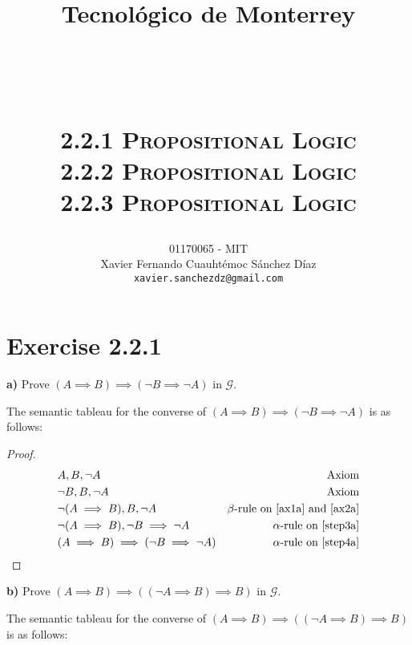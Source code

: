\documentclass[titlepage, letterpaper, fleqn]{article}
\title{
\vspace{1in}
\textbf{Tecnológico de Monterrey} \\
\vspace{0.5in}
\textmd{\mahclass} \\
\large{\textit{\mahteacher}} \\
\vspace{0.5in}
\textsc{\mahtitle}\\
\textsc{2.2.1 Propositional Logic}\\
\textsc{2.2.2 Propositional Logic}\\
\textsc{2.2.3 Propositional Logic}\\
\author{01170065  - MIT \\
Xavier Fernando Cuauhtémoc Sánchez Díaz \\
\texttt{xavier.sanchezdz@gmail.com}}
\date{\mahdate}
}
\newcommand{\spacepls}{\vspace{5mm}}
\begin{document}
\begin{titlepage}
\maketitle
\end{titlepage}

%
%

\section{Exercise 2.2.1}

{\large \textbf{a)} Prove \((A \implies B) \implies (\neg B \implies \neg A)\) in \(\mathscr{G}\).}

The semantic tableau for the converse of \((A \implies B) \implies (\neg B \implies \neg A)\) is as follows:

\spacepls


\spacepls

\begin{proof}
\begin{align}
& A, B, \neg A & \text{Axiom} \label{ax1a}
\\ & \neg B, B, \neg A & \text{Axiom} \label{ax2a}
\\ & \neg(A \implies B), B, \neg A & \text{$\beta$-rule on \ref{ax1a} and \ref{ax2a}} \label{step3a}
\\ & \neg(A \implies B), \neg B \implies \neg A & \text{$\alpha$-rule on \ref{step3a}} \label{step4a}
\\ & (A \implies B) \implies (\neg B \implies \neg A) & \text{$\alpha$-rule on \ref{step4a}}
\end{align}
\end{proof}

{\large \textbf{b)} Prove \((A \implies B) \implies ((\neg A \implies B)\implies B)\) in \(\mathscr{G}\).}

The semantic tableau for the converse of \((A \implies B) \implies ((\neg A \implies B)\implies B)\) is as follows:
\end{document}
